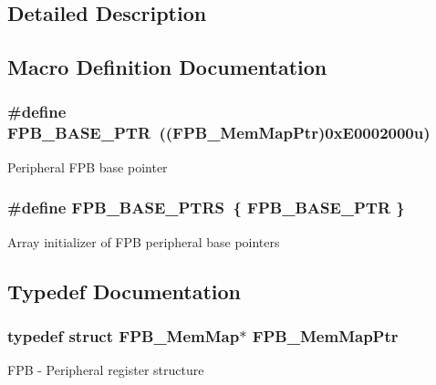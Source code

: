 \subsection{Detailed Description}


\subsection{Macro Definition Documentation}
\hypertarget{group___f_p_b___peripheral_ga95d994c97f967ce02339465def6bac95}{}
\subsubsection[{F\+P\+B\+\_\+\+B\+A\+S\+E\+\_\+\+P\+T\+R}]{\setlength{\rightskip}{0pt plus 5cm}\#define F\+P\+B\+\_\+\+B\+A\+S\+E\+\_\+\+P\+T\+R~(({\bf F\+P\+B\+\_\+\+Mem\+Map\+Ptr})0x\+E0002000u)}\label{group___f_p_b___peripheral_ga95d994c97f967ce02339465def6bac95}
Peripheral F\+P\+B base pointer \hypertarget{group___f_p_b___peripheral_ga3073bbdd81158d27cf132d1df17fa83f}{}
\subsubsection[{F\+P\+B\+\_\+\+B\+A\+S\+E\+\_\+\+P\+T\+R\+S}]{\setlength{\rightskip}{0pt plus 5cm}\#define F\+P\+B\+\_\+\+B\+A\+S\+E\+\_\+\+P\+T\+R\+S~\{ {\bf F\+P\+B\+\_\+\+B\+A\+S\+E\+\_\+\+P\+T\+R} \}}\label{group___f_p_b___peripheral_ga3073bbdd81158d27cf132d1df17fa83f}
Array initializer of F\+P\+B peripheral base pointers 

\subsection{Typedef Documentation}
\hypertarget{group___f_p_b___peripheral_gaffb8b5a06bae98ff71e1337bfd371172}{}
\subsubsection[{F\+P\+B\+\_\+\+Mem\+Map\+Ptr}]{\setlength{\rightskip}{0pt plus 5cm}typedef struct {\bf F\+P\+B\+\_\+\+Mem\+Map}$\ast$ {\bf F\+P\+B\+\_\+\+Mem\+Map\+Ptr}}\label{group___f_p_b___peripheral_gaffb8b5a06bae98ff71e1337bfd371172}
F\+P\+B -\/ Peripheral register structure 